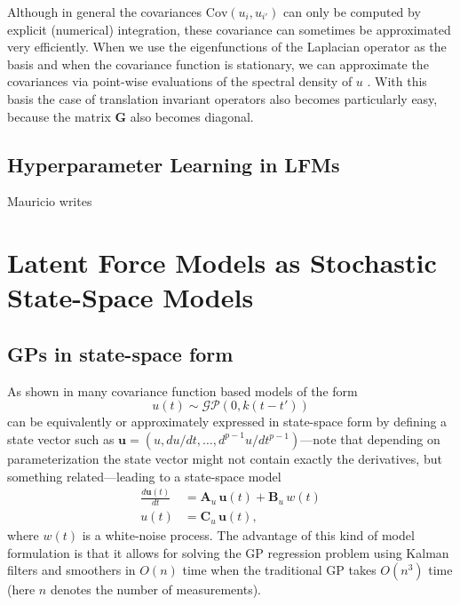 \documentclass[journal]{IEEEtran}
\newcommand{\simo}[1]{{\color{red}#1}}
\begin{document}
Although in general the covariances $\mathrm{Cov}(u_i,u_{i'})$ can only be computed by explicit (numerical) integration, these covariance can sometimes be approximated very efficiently. When we use the eigenfunctions of the Laplacian operator as the basis and when the covariance function is stationary, we can approximate the covariances via point-wise evaluations of the spectral density of $u$ \cite{Solin+Sarkka:2016}. With this basis the case of translation invariant operators also becomes particularly easy, because the matrix $\mathbf{G}$ also becomes diagonal.

\subsection{Hyperparameter Learning in LFMs}

\simo{Mauricio writes}



\section{Latent Force Models as Stochastic State-Space Models}

\subsection{GPs in state-space form}
As shown in \cite{Hartikainen+Sarkka:2010,Sarkka+Solin+Hartikainen:2013,Sarkka+Piche:2014} many covariance function based models of the form
%
\begin{equation}
  u(t) \sim \mathcal{GP}(0,k(t - t'))
\end{equation}
%
can be equivalently or approximately expressed in state-space form by defining a state vector such as $\mathbf{u} = (u, du/dt,\ldots,d^{p-1}u/dt^{p-1})$---note that depending on parameterization the state vector might not contain exactly the derivatives, but something related---leading to a state-space model
%
\begin{equation}
\begin{split}
  \frac{d\mathbf{u}(t)}{dt}
  &= \mathbf{A}_u \, \mathbf{u}(t) + \mathbf{B}_u \, w(t) \\
  u(t) &= \mathbf{C}_u \, \mathbf{u}(t),
\end{split}
\label{eq:ssu}
\end{equation}
%
where $w(t)$ is a white-noise process. The advantage of this kind of model formulation is that it allows for solving the GP regression problem using Kalman filters and smoothers \cite{Sarkka:2013} in $O(n)$ time when the traditional GP takes $O(n^3)$ time (here $n$ denotes the number of measurements).
\end{document}
